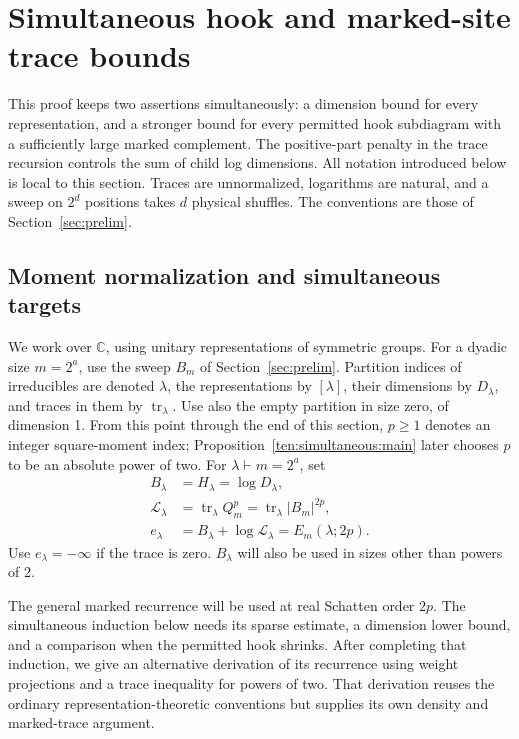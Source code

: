 \section{Simultaneous hook and marked-site trace bounds}
\label{ten:simultaneous}
This proof keeps two assertions simultaneously: a dimension bound for every representation, and a stronger bound for every permitted hook subdiagram with a sufficiently large marked complement. The positive-part penalty in the trace recursion controls the sum of child log dimensions.
\smallskip
All notation introduced below is local to this section. Traces are unnormalized, logarithms are natural, and a sweep on $2^d$ positions takes $d$ physical shuffles. The conventions are those of Section~\ref{sec:prelim}.

\subsection{Moment normalization and simultaneous targets}
We work over \(\mathbb C\), using unitary representations of symmetric groups. For a dyadic size $m=2^a$, use the sweep $B_m$ of Section~\ref{sec:prelim}. Partition indices of irreducibles are denoted \(\lambda\), the representations by \([\lambda]\), their dimensions by \(D_\lambda\), and traces in them by \(\operatorname{tr}_\lambda\). Use also the empty partition in size zero, of dimension 1. From this point through the end of this section, \(p\ge1\) denotes an integer square-moment index; Proposition~\ref{ten:simultaneous:main} later chooses \(p\) to be an absolute power of two. For \(\lambda\vdash m=2^a\), set
\[
 \begin{aligned}
 B_\lambda&=H_\lambda=\log D_\lambda,\\
 \mathcal L_\lambda&=\operatorname{tr}_\lambda Q_m^p
     =\operatorname{tr}_\lambda|B_m|^{2p},\\
 e_\lambda&=B_\lambda+\log\mathcal L_\lambda
     =E_m(\lambda;2p).
 \end{aligned}
\]
Use \(e_\lambda=-\infty\) if the trace is zero. \(B_\lambda\) will also be used in sizes other than powers of 2.

The general marked recurrence will be used at real Schatten order $2p$.
The simultaneous induction below needs its sparse estimate, a dimension
lower bound, and a comparison when the permitted hook shrinks. After
completing that induction, we give an alternative derivation of its
recurrence using weight projections and a trace inequality for powers
of two. That derivation reuses the ordinary representation-theoretic
conventions but supplies its own density and marked-trace argument.

